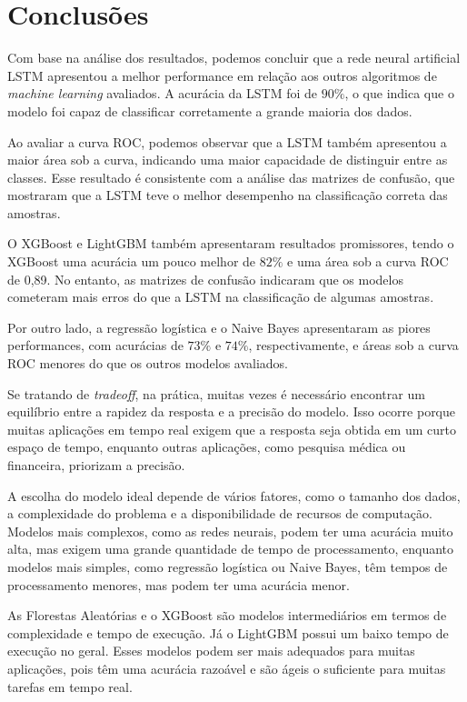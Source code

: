 \section{Conclusões}
\label{sec:conclu}

Com base na análise dos resultados, podemos concluir que a rede neural artificial LSTM apresentou a melhor performance em relação aos outros algoritmos de \textit{machine learning} avaliados. A acurácia da LSTM foi de $90\%$, o que indica que o modelo foi capaz de classificar corretamente a grande maioria dos dados.

Ao avaliar a curva ROC, podemos observar que a LSTM também apresentou a maior área sob a curva, indicando uma maior capacidade de distinguir entre as classes. Esse resultado é consistente com a análise das matrizes de confusão, que mostraram que a LSTM teve o melhor desempenho na classificação correta das amostras.

O XGBoost e LightGBM também apresentaram resultados promissores, tendo o XGBoost uma acurácia um pouco melhor de $82\%$ e uma área sob a curva ROC de 0,89. No entanto, as matrizes de confusão indicaram que os modelos cometeram mais erros do que a LSTM na classificação de algumas amostras.

Por outro lado, a regressão logística e o Naive Bayes apresentaram as piores performances, com acurácias de $73\%$ e $74\%$, respectivamente, e áreas sob a curva ROC menores do que os outros modelos avaliados.

Se tratando de \textit{tradeoff}, na prática, muitas vezes é necessário encontrar um equilíbrio entre a rapidez da resposta e a precisão do modelo. Isso ocorre porque muitas aplicações em tempo real exigem que a resposta seja obtida em um curto espaço de tempo, enquanto outras aplicações, como pesquisa médica ou financeira, priorizam a precisão.

A escolha do modelo ideal depende de vários fatores, como o tamanho dos dados, a complexidade do problema e a disponibilidade de recursos de computação. Modelos mais complexos, como as redes neurais, podem ter uma acurácia muito alta, mas exigem uma grande quantidade de tempo de processamento, enquanto modelos mais simples, como regressão logística ou Naive Bayes, têm tempos de processamento menores, mas podem ter uma acurácia menor.

As Florestas Aleatórias e o XGBoost são modelos intermediários em termos de complexidade e tempo de execução. Já o LightGBM possui um baixo tempo de execução no geral. Esses modelos podem ser mais adequados para muitas aplicações, pois têm uma acurácia razoável e são ágeis o suficiente para muitas tarefas em tempo real.

